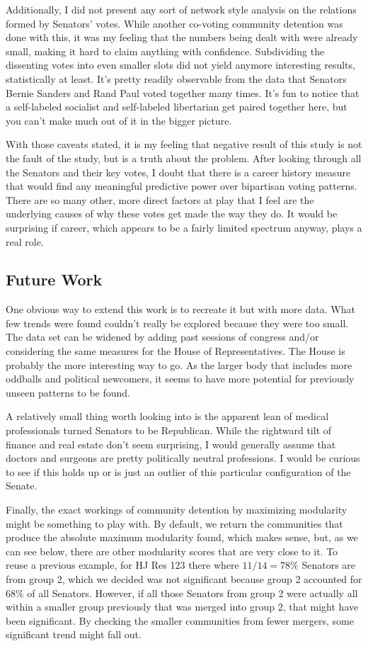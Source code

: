 \documentclass[11pt,twocolumn]{article}
\begin{document}
	Additionally, I did not present any sort of network style analysis on the relations formed by Senators' votes. While another co-voting community detention was done with this, it was my feeling that the numbers being dealt with were already small, making it hard to claim anything with confidence. Subdividing the dissenting votes into even smaller slots did not yield anymore interesting results, statistically at least. It's pretty readily observable from the data that Senators Bernie Sanders and Rand Paul voted together many times. It's fun to notice that a self-labeled socialist and self-labeled libertarian get paired together here, but you can't make much out of it in the bigger picture.
	
	With those caveats stated, it is my feeling that negative result of this study is not the fault of the study, but is a truth about the problem. After looking through all the Senators and their key votes, I doubt that there is a career history measure that would find any meaningful predictive power over bipartisan voting patterns. There are so many other, more direct factors at play that I feel are the underlying causes of why these votes get made the way they do. It would be surprising if career, which appears to be a fairly limited spectrum anyway, plays a real role.
	
	\subsection{Future Work}
	One obvious way to extend this work is to recreate it but with more data. What few trends were found couldn't really be explored because they were too small. The data set can be widened by adding past sessions of congress and/or considering the same measures for the House of Representatives. The House is probably the more interesting way to go. As the larger body that includes more oddballs and political newcomers, it seems to have more potential for previously unseen patterns to be found.
	
	A relatively small thing worth looking into is the apparent lean of medical professionals turned Senators to be Republican. While the rightward tilt of finance and real estate don't seem surprising, I would generally assume that doctors and surgeons are pretty politically neutral professions. I would be curious to see if this holds up or is just an outlier of this particular configuration of the Senate.
	
	Finally, the exact workings of community detention by maximizing modularity might be something to play with. By default, we return the communities that produce the absolute maximum modularity found, which makes sense, but, as we can see below, there are other modularity scores that are very close to it. To reuse a previous example, for HJ Res 123 there where $11/14 = 78\%$ Senators are from group 2, which we decided was not significant because group 2 accounted for $68\%$ of all Senators. However, if all those Senators from group 2 were actually all within a smaller group previously that was merged into group 2, that might have been significant. By checking the smaller communities from fewer mergers, some significant trend might fall out.
		
\end{document}
